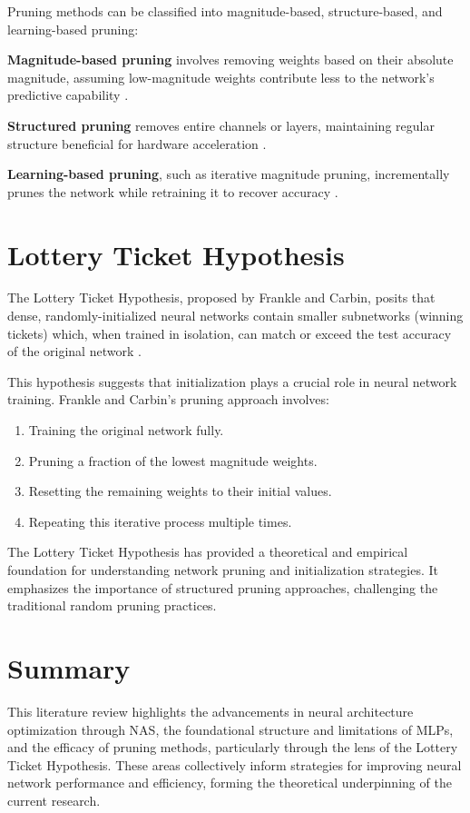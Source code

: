 Pruning methods can be classified into magnitude-based, structure-based, and learning-based pruning:

\textbf{Magnitude-based pruning} involves removing weights based on their absolute magnitude, assuming low-magnitude weights contribute less to the network's predictive capability \cite{han2015learning}.

\textbf{Structured pruning} removes entire channels or layers, maintaining regular structure beneficial for hardware acceleration \cite{he2017channel}.

\textbf{Learning-based pruning}, such as iterative magnitude pruning, incrementally prunes the network while retraining it to recover accuracy \cite{han2015learning}.

\section{Lottery Ticket Hypothesis}
The Lottery Ticket Hypothesis, proposed by Frankle and Carbin, posits that dense, randomly-initialized neural networks contain smaller subnetworks (winning tickets) which, when trained in isolation, can match or exceed the test accuracy of the original network \cite{frankle2018lottery}.

This hypothesis suggests that initialization plays a crucial role in neural network training. Frankle and Carbin’s pruning approach involves:
\begin{enumerate}
\item Training the original network fully.
\item Pruning a fraction of the lowest magnitude weights.
\item Resetting the remaining weights to their initial values.
\item Repeating this iterative process multiple times.
\end{enumerate}

The Lottery Ticket Hypothesis has provided a theoretical and empirical foundation for understanding network pruning and initialization strategies. It emphasizes the importance of structured pruning approaches, challenging the traditional random pruning practices.

\section{Summary}
This literature review highlights the advancements in neural architecture optimization through NAS, the foundational structure and limitations of MLPs, and the efficacy of pruning methods, particularly through the lens of the Lottery Ticket Hypothesis. These areas collectively inform strategies for improving neural network performance and efficiency, forming the theoretical underpinning of the current research.